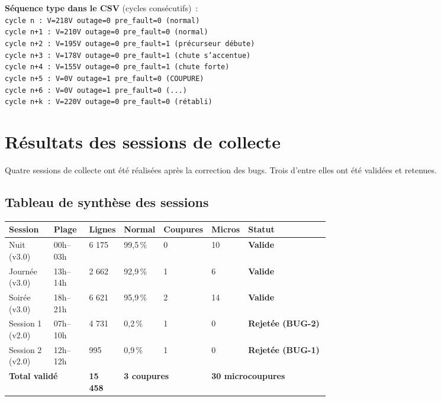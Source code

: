 \documentclass[12pt,a4paper]{article}
\newcommand{\ok}[1]{\textcolor{vertOK}{\textbf{#1}}}
\newcommand{\err}[1]{\textcolor{rougeERR}{\textbf{#1}}}
\begin{document}
\begin{mdframed}[style=encadre]
\textbf{Séquence type dans le CSV} (cycles consécutifs)~:\\[4pt]
\texttt{cycle n   : V=218V  outage=0  pre\_fault=0  (normal)}\\
\texttt{cycle n+1 : V=210V  outage=0  pre\_fault=0  (normal)}\\
\texttt{cycle n+2 : V=195V  outage=0  pre\_fault=1  (précurseur débute)}\\
\texttt{cycle n+3 : V=178V  outage=0  pre\_fault=1  (chute s'accentue)}\\
\texttt{cycle n+4 : V=155V  outage=0  pre\_fault=1  (chute forte)}\\
\texttt{cycle n+5 : V=0V    outage=1  pre\_fault=0  (COUPURE)}\\
\texttt{cycle n+6 : V=0V    outage=1  pre\_fault=0  (...)}\\
\texttt{cycle n+k : V=220V  outage=0  pre\_fault=0  (rétabli)}
\end{mdframed}

\section{Résultats des sessions de collecte}
\label{sec:sessions}

Quatre sessions de collecte ont été réalisées après la correction des
bugs. Trois d'entre elles ont été validées et retenues.

\subsection{Tableau de synthèse des sessions}

\begin{center}
\begin{tabularx}{\linewidth}{p{0.14\linewidth} p{0.11\linewidth}
                              p{0.08\linewidth} p{0.10\linewidth}
                              p{0.10\linewidth} p{0.10\linewidth} X}
\toprule
\textbf{Session} & \textbf{Plage} & \textbf{Lignes} &
\textbf{Normal} & \textbf{Coupures} & \textbf{Micros} &
\textbf{Statut} \\
\midrule
Nuit (v3.0)     & 00h–03h & 6 175  & 99{,}5\,\% & 0  & 10 &
  \ok{Valide} \\
Journée (v3.0)  & 13h–14h & 2 662  & 92{,}9\,\% & 1  &  6 &
  \ok{Valide} \\
Soirée (v3.0)   & 18h–21h & 6 621  & 95{,}9\,\% & 2  & 14 &
  \ok{Valide} \\
\midrule
Session 1 (v2.0) & 07h–10h & 4 731  & 0{,}2\,\%  & 1  &  0 &
  \err{Rejetée (BUG-2)} \\
Session 2 (v2.0) & 12h–12h & 995   & 0{,}9\,\%  & 1  &  0 &
  \err{Rejetée (BUG-1)} \\
\midrule
\multicolumn{2}{l}{\textbf{Total validé}} & \textbf{15 458} &
  \multicolumn{2}{l}{\textbf{3 coupures}} &
  \multicolumn{2}{l}{\textbf{30 microcoupures}} \\
\bottomrule
\end{tabularx}
\end{center}
\end{document}
